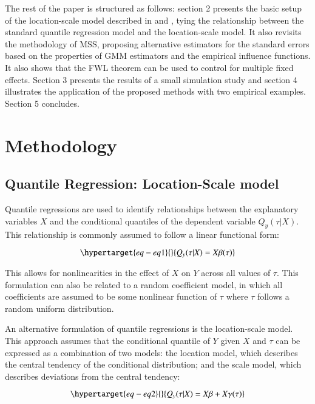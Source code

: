 \documentclass[
  authoryear,
  review,
  1p]{elsarticle}
\begin{document}
The rest of the paper is structured as follows: section 2 presents the
basic setup of the location-scale model described in \citet{he1997} and
\citet{zhao2000}, tying the relationship between the standard quantile
regression model and the location-scale model. It also revisits the
methodology of MSS, proposing alternative estimators for the standard
errors based on the properties of GMM estimators and the empirical
influence functions. It also shows that the FWL theorem can be used to
control for multiple fixed effects. Section 3 presents the results of a
small simulation study and section 4 illustrates the application of the
proposed methods with two empirical examples. Section 5 concludes.

\hypertarget{sec-method}{%
\section{Methodology}\label{sec-method}}

\hypertarget{sec-betas}{%
\subsection{Quantile Regression: Location-Scale model}\label{sec-betas}}

Quantile regressions are used to identify relationships between the
explanatory variables \(X\) and the conditional quantiles of the
dependent variable \(Q_y(\tau|X)\). This relationship is commonly
assumed to follow a linear functional form:

\begin{equation}\protect\hypertarget{eq-eq1}{}{Q_y(\tau|X) =X\beta(\tau)
}\label{eq-eq1}\end{equation}

This allows for nonlinearities in the effect of \(X\) on \(Y\) across
all values of \(\tau\). This formulation can also be related to a random
coefficient model, in which all coefficients are assumed to be some
nonlinear function of \(\tau\) where \(\tau\) follows a random uniform
distribution.

An alternative formulation of quantile regressions is the location-scale
model. This approach assumes that the conditional quantile of \(Y\)
given \(X\) and \(\tau\) can be expressed as a combination of two
models: the location model, which describes the central tendency of the
conditional distribution; and the scale model, which describes
deviations from the central tendency:

\begin{equation}\protect\hypertarget{eq-eq2}{}{Q_y(\tau|X) =X\beta+X\gamma(\tau)
}\label{eq-eq2}\end{equation}
\end{document}
